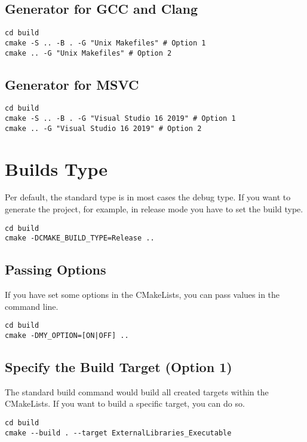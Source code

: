 \subsection{Generator for GCC and Clang}

\begin{verbatim}
cd build
cmake -S .. -B . -G "Unix Makefiles" # Option 1
cmake .. -G "Unix Makefiles" # Option 2
\end{verbatim}

\subsection{Generator for MSVC}

\begin{verbatim}
cd build
cmake -S .. -B . -G "Visual Studio 16 2019" # Option 1
cmake .. -G "Visual Studio 16 2019" # Option 2
\end{verbatim}

\section{Builds Type}

Per default, the standard type is in most cases the debug type.
If you want to generate the project, for example, in release mode you have to set the build type.

\begin{verbatim}
cd build
cmake -DCMAKE_BUILD_TYPE=Release ..
\end{verbatim}

\subsection{Passing Options}

If you have set some options in the CMakeLists, you can pass values in the command line.

\begin{verbatim}
cd build
cmake -DMY_OPTION=[ON|OFF] ..
\end{verbatim}

\subsection{Specify the Build Target (Option 1)}

The standard build command would build all created targets within the CMakeLists.
If you want to build a specific target, you can do so.

\begin{verbatim}
cd build
cmake --build . --target ExternalLibraries_Executable
\end{verbatim}


